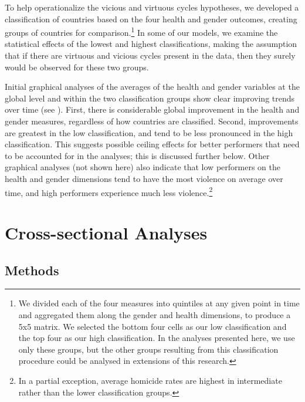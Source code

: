 \documentclass[12pt]{article}
\begin{document}
To help operationalize the vicious and virtuous cycles hypotheses, we developed a classification of countries based on the four health and gender outcomes, creating groups of countries for comparison.\footnote{We divided each of the four measures into quintiles at any given point in time and aggregated them along the gender and health dimensions, to produce a 5x5 matrix. We selected the bottom four cells as our low classification and the top four as our high classification. In the analyses presented here, we use only these groups, but the other groups resulting from this classification procedure could be analysed in extensions of this research.}
In some of our models, we examine the statistical effects of the lowest and highest classifications, making the assumption that if there are virtuous and vicious cycles present in the data, then they surely would be observed for these two groups.

Initial graphical analyses of the averages of the health and gender variables at the global level and within the two classification groups show clear improving trends over time (see ).
First, there is considerable global improvement in the health and gender measures, regardless of how countries are classified.
Second, improvements are greatest in the low classification, and tend to be less pronounced in the high classification.
This suggests possible ceiling effects for better performers that need to be accounted for in the analyses; this is discussed further below.
Other graphical analyses (not shown here) also indicate that low performers on the health and gender dimensions tend to have the most violence on average over time, and high performers experience much less violence.\footnote{In a partial exception, average homicide rates are highest in intermediate rather than the lower classification groups.}

\section{Cross-sectional Analyses}

\subsection{Methods}
\end{document}
